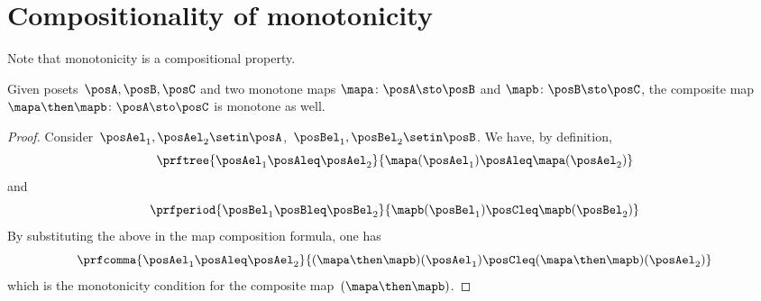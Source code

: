
\section{Compositionality of monotonicity}
Note that monotonicity is a compositional property.
\begin{lemma}
    Given posets~$\posA,\posB,\posC$ and two monotone maps $\mapa\colon \posA \sto \posB$ and $\mapb\colon \posB \sto \posC$, the composite map $\mapa\then \mapb\colon \posA \sto \posC$ is monotone as well.
\end{lemma}
\begin{proof}
    Consider~$\posAel_1,\posAel_2 \setin \posA$,~$\posBel_1,\posBel_2\setin \posB$.
    We have, by definition,
    \begin{equation*}
        \prftree{\posAel_1\posAleq \posAel_2}{\mapa(\posAel_1)\posAleq \mapa(\posAel_2)}
    \end{equation*}
    and
    \begin{equation*}
        \prfperiod{\posBel_1\posBleq \posBel_2}{\mapb(\posBel_1)\posCleq \mapb(\posBel_2)}
    \end{equation*}
    By substituting the above in the map composition formula, one has
    \begin{equation}
        \prfcomma{\posAel_1\posAleq \posAel_2 }{ (\mapa\then \mapb)(\posAel_1) \posCleq (\mapa\then \mapb)(\posAel_2)}
    \end{equation}
    which is the monotonicity condition for the composite map~$(\mapa\then \mapb)$.
\end{proof}
